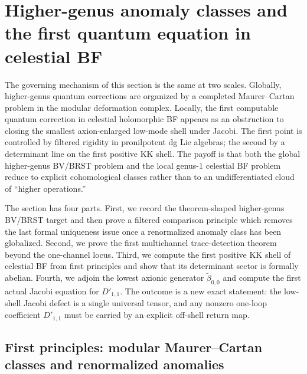 
\section{Higher-genus anomaly classes and the first quantum equation in celestial BF}
\label{sec:celestial-bf-frontier-synthesis}

The governing mechanism of this section is the same at two scales.
Globally, higher-genus quantum corrections are organized by a completed
Maurer--Cartan problem in the modular deformation complex.  Locally, the
first computable quantum correction in celestial holomorphic BF appears as
an obstruction to closing the smallest axion-enlarged low-mode shell under
Jacobi.
The first point is controlled by filtered rigidity in pronilpotent dg Lie
algebras; the second by a determinant line on the first positive KK shell.
The payoff is that both the global higher-genus BV/BRST problem and the
local genus-$1$ celestial BF problem reduce to explicit cohomological
classes rather than to an undifferentiated cloud of ``higher operations.''

The section has four parts.
First, we record the theorem-shaped higher-genus BV/BRST target and then
prove a filtered comparison principle which removes the last formal
uniqueness issue once a renormalized anomaly class has been globalized.
Second, we prove the first multichannel trace-detection theorem beyond the
one-channel locus.
Third, we compute the first positive KK shell of celestial BF from first
principles and show that its determinant sector is formally abelian.
Fourth, we adjoin the lowest axionic generator
$\widetilde\beta_{0,0}$ and compute the first actual Jacobi equation for
$D'_{1,1}$.
The outcome is a new exact statement: the low-shell Jacobi defect is a
single universal tensor, and any nonzero one-loop coefficient
$D'_{1,1}$ must be carried by an explicit off-shell return map.

\subsection{First principles: modular Maurer--Cartan classes and renormalized anomalies}
\label{subsec:frontier-renormalized-anomaly}

